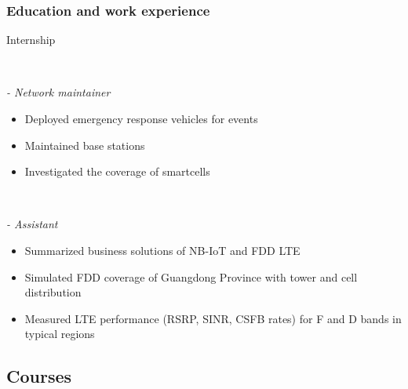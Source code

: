 \documentclass{beamer}
\begin{document}
\begin{frame}
\frametitle{Education and work experience}

\begin{block}{Internship}

\begin{minipage}[t]{0.7\textwidth}
\end{minipage}
~
\begin{minipage}[t]{0.2\textwidth}
\end{minipage}

\textit{  - Network maintainer}

\begin{itemize}
  \item Deployed emergency response vehicles for events
  \item Maintained base stations
  \item Investigated the coverage of smartcells
\end{itemize}



\begin{minipage}[t]{0.7\textwidth}
\end{minipage}
~
\begin{minipage}[t]{0.2\textwidth}
\end{minipage}

\textit{  - Assistant}

\begin{itemize}
  \item Summarized business solutions of NB-IoT and FDD LTE
  \item Simulated FDD coverage of Guangdong Province with tower and cell distribution
  \item Measured LTE performance (RSRP, SINR, CSFB rates) for F and D bands in typical regions
\end{itemize}

\end{block}

\end{frame}


\subsection{Courses}
\end{document}
